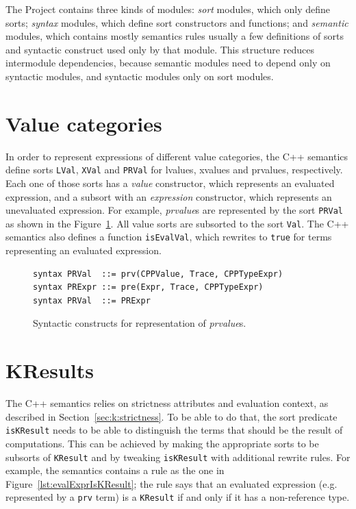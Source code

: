 \documentclass[nolot,nolof,nocover,printed]{fithesis3}
\newcommand{\Project}{Project\xspace}
\begin{document}
The \Project contains three kinds of modules: \textit{sort} modules, which only define sorts; \textit{syntax} modules, which define sort constructors and functions; and \textit{semantic} modules, which contains mostly semantics rules usually a few definitions of sorts and syntactic construct used only by that module. This structure reduces intermodule dependencies, because semantic modules need to depend only on syntactic modules, and syntactic modules only on sort modules.

\section{Value categories}\label{sec:proj:values}

In order to represent expressions of different value categories, the C++ semantics define sorts \texttt{LVal}, \texttt{XVal} and \texttt{PRVal} for lvalues, xvalues and prvalues, respectively. Each one of those sorts has a \textit{value} constructor, which represents an evaluated expression, and a subsort with an \textit{expression} constructor, which represents an unevaluated expression. For example, \textit{prvalue}s are represented by the sort \texttt{PRVal} as shown in the Figure~\ref{fig:prvSyntax}. All value sorts are subsorted to the sort \texttt{Val}. The C++ semantics also defines a function \texttt{isEvalVal}, which rewrites to \texttt{true} for terms representing an evaluated expression.

\begin{figure}[hp]
\begin{lstlisting}
syntax PRVal  ::= prv(CPPValue, Trace, CPPTypeExpr)
syntax PRExpr ::= pre(Expr, Trace, CPPTypeExpr)
syntax PRVal  ::= PRExpr
\end{lstlisting}
\caption{Syntactic constructs for representation of \textit{prvalue}s.}
\label{fig:prvSyntax}
\end{figure}



\section{KResults}\label{sec:proj:kresults}

The C++ semantics relies on strictness attributes and evaluation context, as described in Section~\ref{sec:k:strictness}. To be able to do that, the sort predicate \texttt{isKResult} needs to be able to distinguish the terms that should be the result of computations. This can be achieved by making the appropriate sorts to be subsorts of \texttt{KResult} and by tweaking \texttt{isKResult} with additional rewrite rules. For example, the semantics contains a rule as the one in Figure~\ref{lst:evalExprIsKResult}; the rule says that an evaluated expression (e.g. represented by a \texttt{prv} term) is a \texttt{KResult} if and only if it has a non-reference type.
\end{document}
